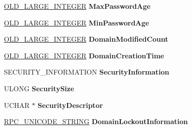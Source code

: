 \begin{DoxyCompactItemize}
\hyperlink{struct___o_l_d___l_a_r_g_e___i_n_t_e_g_e_r}{O\+L\+D\+\_\+\+L\+A\+R\+G\+E\+\_\+\+I\+N\+T\+E\+G\+ER} {\bfseries Max\+Password\+Age}
\item 
\mbox{\label{struct___n_e_t_l_o_g_o_n___d_e_l_t_a___d_o_m_a_i_n_a6e88da0325036c8fd08a0a59723fbd9f}} 
\hyperlink{struct___o_l_d___l_a_r_g_e___i_n_t_e_g_e_r}{O\+L\+D\+\_\+\+L\+A\+R\+G\+E\+\_\+\+I\+N\+T\+E\+G\+ER} {\bfseries Min\+Password\+Age}
\item 
\mbox{\label{struct___n_e_t_l_o_g_o_n___d_e_l_t_a___d_o_m_a_i_n_aa7448628d1e9c36a39539798f7816737}} 
\hyperlink{struct___o_l_d___l_a_r_g_e___i_n_t_e_g_e_r}{O\+L\+D\+\_\+\+L\+A\+R\+G\+E\+\_\+\+I\+N\+T\+E\+G\+ER} {\bfseries Domain\+Modified\+Count}
\item 
\mbox{\label{struct___n_e_t_l_o_g_o_n___d_e_l_t_a___d_o_m_a_i_n_a8bc9b1c4fa3a48ca8e683dde6c989e51}} 
\hyperlink{struct___o_l_d___l_a_r_g_e___i_n_t_e_g_e_r}{O\+L\+D\+\_\+\+L\+A\+R\+G\+E\+\_\+\+I\+N\+T\+E\+G\+ER} {\bfseries Domain\+Creation\+Time}
\item 
\mbox{\label{struct___n_e_t_l_o_g_o_n___d_e_l_t_a___d_o_m_a_i_n_ac810aa32fe8fdf1e771a8c2d0b1a76fc}} 
S\+E\+C\+U\+R\+I\+T\+Y\+\_\+\+I\+N\+F\+O\+R\+M\+A\+T\+I\+ON {\bfseries Security\+Information}
\item 
\mbox{\label{struct___n_e_t_l_o_g_o_n___d_e_l_t_a___d_o_m_a_i_n_a453544619d96406ec0db2ca2fc0bf39d}} 
U\+L\+O\+NG {\bfseries Security\+Size}
\item 
\mbox{\label{struct___n_e_t_l_o_g_o_n___d_e_l_t_a___d_o_m_a_i_n_a25b5532ebf4180440910312e50292463}} 
U\+C\+H\+AR $\ast$ {\bfseries Security\+Descriptor}
\item 
\mbox{\label{struct___n_e_t_l_o_g_o_n___d_e_l_t_a___d_o_m_a_i_n_a67e2d39521817a89fab2dbe047812534}} 
\hyperlink{struct___r_p_c___u_n_i_c_o_d_e___s_t_r_i_n_g}{R\+P\+C\+\_\+\+U\+N\+I\+C\+O\+D\+E\+\_\+\+S\+T\+R\+I\+NG} {\bfseries Domain\+Lockout\+Information}

\end{DoxyCompactItemize}
